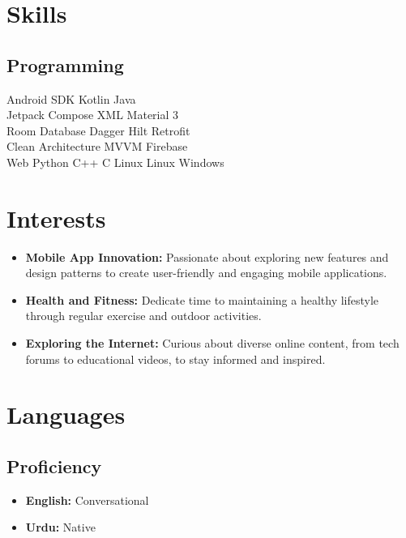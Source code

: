 \documentclass[bold]{deedy-resume-openfont}
\begin{document}
\begin{minipage}[t]{0.33\textwidth}

\section{Skills}
\subsection{Programming}
Android SDK \textbullet{} Kotlin \textbullet{} Java \\
Jetpack Compose \textbullet{} XML \textbullet{} Material 3  \\
Room Database \textbullet{} Dagger Hilt \textbullet{} Retrofit  \\
Clean Architecture \textbullet{} MVVM \textbullet{} Firebase  \\
Web \textbullet{} Python \textbullet{} C++ \textbullet{} C \textbullet{} Linux
Linux \textbullet{} Windows
\sectionsep


\section*{Interests}
\begin{itemize}[leftmargin=0pt]
    \item \textbf{Mobile App Innovation:} Passionate about exploring new features and design patterns to create user-friendly and engaging mobile applications.
    \item \textbf{Health and Fitness:} Dedicate time to maintaining a healthy lifestyle through regular exercise and outdoor activities.
    \item \textbf{Exploring the Internet:} Curious about diverse online content, from tech forums to educational videos, to stay informed and inspired.
\end{itemize}


\section{Languages}
\subsection{Proficiency}
\begin{itemize}[label=\textbullet, leftmargin=*, topsep=5pt, itemsep=-1ex]
    \item \textbf{English:} Conversational
    \item \textbf{Urdu:} Native
\end{itemize}
\sectionsep


%
%

\end{minipage} 
\end{document}
